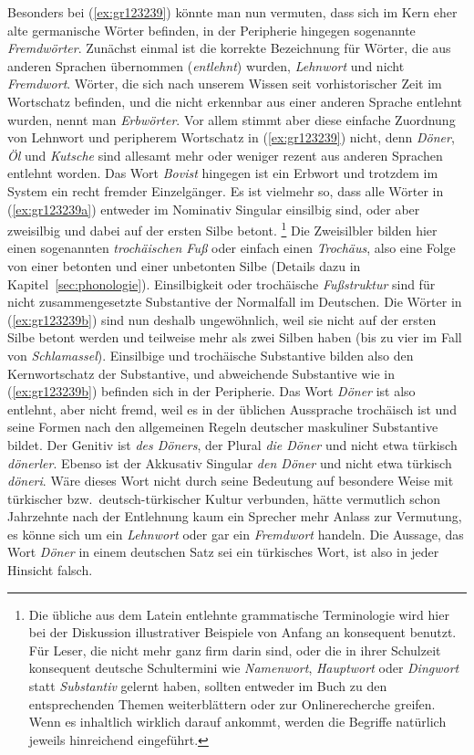 Besonders bei (\ref{ex:gr123239}) könnte man nun vermuten, dass sich im Kern eher alte germanische Wörter befinden, in der Peripherie hingegen sogenannte \textit{Fremdwörter}.
Zunächst einmal ist die korrekte Bezeichnung für Wörter, die aus anderen Sprachen übernommen (\textit{entlehnt}) wurden, \textit{Lehnwort} und nicht \textit{Fremdwort}.
Wörter, die sich nach unserem Wissen seit vorhistorischer Zeit im Wortschatz befinden, und die nicht erkennbar aus einer anderen Sprache entlehnt wurden, nennt man \textit{Erbwörter}.
Vor allem stimmt aber diese einfache Zuordnung von Lehnwort und peripherem Wortschatz in (\ref{ex:gr123239}) nicht, denn \textit{Döner}, \textit{Öl} und \textit{Kutsche} sind allesamt mehr oder weniger rezent aus anderen Sprachen entlehnt worden.
Das Wort \textit{Bovist} hingegen ist ein Erbwort und trotzdem im System ein recht fremder Einzelgänger.
Es ist vielmehr so, dass alle Wörter in (\ref{ex:gr123239a}) entweder im Nominativ Singular einsilbig sind, oder aber zweisilbig und dabei auf der ersten Silbe betont.%
\footnote{Die übliche aus dem Latein entlehnte grammatische Terminologie wird hier bei der Diskussion illustrativer Beispiele von Anfang an konsequent benutzt.
Für Leser, die nicht mehr ganz firm darin sind, oder die in ihrer Schulzeit konsequent deutsche Schultermini wie \zB \textit{Namenwort}, \textit{Hauptwort} oder \textit{Dingwort} statt \textit{Substantiv} gelernt haben, sollten entweder im Buch zu den entsprechenden Themen weiterblättern oder zur Onlinerecherche greifen.
Wenn es inhaltlich wirklich darauf ankommt, werden die Begriffe natürlich jeweils hinreichend eingeführt.}
Die Zweisilbler bilden hier einen sogenannten \textit{trochäischen Fuß} oder einfach einen \textit{Trochäus}, also eine Folge von einer betonten und einer unbetonten Silbe (Details dazu in Kapitel~\ref{sec:phonologie}).
Einsilbigkeit oder trochäische \textit{Fußstruktur} sind für nicht zusammengesetzte Substantive der Normalfall im Deutschen.
Die Wörter in (\ref{ex:gr123239b}) sind nun deshalb ungewöhnlich, weil sie nicht auf der ersten Silbe betont werden und teilweise mehr als zwei Silben haben (bis zu vier im Fall von \textit{Schlamassel}).
Einsilbige und trochäische Substantive bilden also den Kernwortschatz der Substantive, und abweichende Substantive wie in (\ref{ex:gr123239b}) befinden sich in der Peripherie.
Das Wort \textit{Döner} ist also entlehnt, aber nicht fremd, weil es in der üblichen Aussprache trochäisch ist und seine Formen nach den allgemeinen Regeln deutscher maskuliner Substantive bildet.
Der Genitiv ist \textit{des Döners}, der Plural \textit{die Döner} und nicht etwa türkisch \textit{dönerler}.
Ebenso ist der Akkusativ Singular \textit{den Döner} und nicht etwa türkisch \textit{döneri}.
Wäre dieses Wort nicht durch seine Bedeutung auf besondere Weise mit türkischer bzw.\ deutsch-türkischer Kultur verbunden, hätte vermutlich schon Jahrzehnte nach der Entlehnung kaum ein Sprecher mehr Anlass zur Vermutung, es könne sich um ein \textit{Lehnwort} oder gar ein \textit{Fremdwort} handeln.
Die Aussage, das Wort \textit{Döner} in einem deutschen Satz sei ein türkisches Wort, ist also in jeder Hinsicht falsch.

